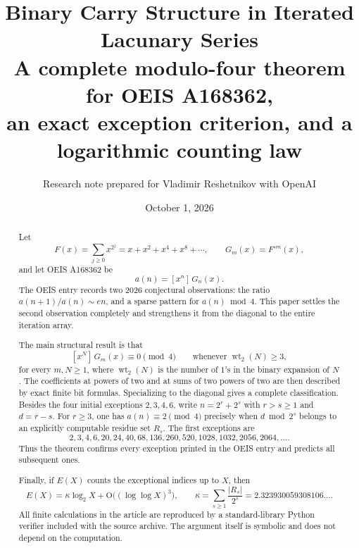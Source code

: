 \documentclass[11pt]{article}
\title{\bfseries\color{deepblue}
Binary Carry Structure in Iterated Lacunary Series\\[5pt]
\large A complete modulo-four theorem for OEIS A168362,\\
an exact exception criterion, and a logarithmic counting law}
\author{Research note prepared for Vladimir Reshetnikov with OpenAI}
\date{October 1, 2026}
\theoremstyle{definition}
\theoremstyle{remark}
\newcommand{\coef}[2]{[x^{#1}]\,#2}
\newcommand{\wt}{\operatorname{wt}_2}
\newcommand{\Oh}{\mathrm O}
\begin{document}
\maketitle

\begin{abstract}
Let
\[
  F(x)=\sum_{j\ge 0}x^{2^j}=x+x^2+x^4+x^8+\cdots,
  \qquad G_m(x)=F^{\circ m}(x),
\]
and let OEIS A168362 be
\[
  a(n)=\coef{n}{G_n(x)}.
\]
The OEIS entry records two 2026 conjectural observations: the ratio
$a(n+1)/a(n)\sim en$, and a sparse pattern for $a(n)\bmod 4$.  This paper
settles the second observation completely and strengthens it from the diagonal
to the entire iteration array.

The main structural result is that
\[
  \coef{N}{G_m(x)}\equiv0\pmod4
  \qquad\text{whenever }\wt(N)\ge3,
\]
for every $m,N\ge1$, where $\wt(N)$ is the number of $1$'s in the binary
expansion of $N$.  The coefficients at powers of two and at sums of two powers
of two are then described by exact finite bit formulas.  Specializing to the
diagonal gives a complete classification.  Besides the four initial
exceptions $2,3,4,6$, write $n=2^r+2^s$ with $r>s\ge1$ and $d=r-s$.
For $r\ge3$, one has $a(n)\equiv2\pmod4$ precisely when
$d\bmod 2^s$ belongs to an explicitly computable residue set $R_s$.
The first exceptions are
\[
2,3,4,6,20,24,40,68,136,260,520,1028,1032,2056,2064,\ldots.
\]
Thus the theorem confirms every exception printed in the OEIS entry and
predicts all subsequent ones.

Finally, if $E(X)$ counts the exceptional indices up to $X$, then
\[
 E(X)=\kappa\log_2X+\Oh\bigl((\log\log X)^3\bigr),
 \qquad
 \kappa=\sum_{s\ge1}\frac{|R_s|}{2^s}
       =2.323930059308106\ldots.
\]
All finite calculations in the article are reproduced by a standard-library
Python verifier included with the source archive.  The argument itself is
symbolic and does not depend on the computation.
\end{abstract}

\begin{center}
\end{center}
\end{document}
